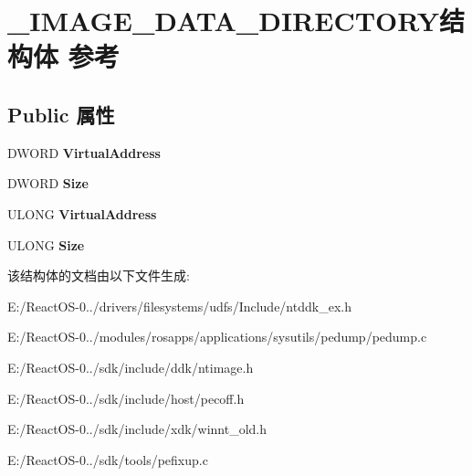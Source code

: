\hypertarget{struct___i_m_a_g_e___d_a_t_a___d_i_r_e_c_t_o_r_y}{}\section{\+\_\+\+I\+M\+A\+G\+E\+\_\+\+D\+A\+T\+A\+\_\+\+D\+I\+R\+E\+C\+T\+O\+R\+Y结构体 参考}
\label{struct___i_m_a_g_e___d_a_t_a___d_i_r_e_c_t_o_r_y}
\subsection*{Public 属性}
\begin{DoxyCompactItemize}
\item 
\mbox{\label{struct___i_m_a_g_e___d_a_t_a___d_i_r_e_c_t_o_r_y_a4367862469fd1ea60088ae02b1b6df70}} 
D\+W\+O\+RD {\bfseries Virtual\+Address}
\item 
\mbox{\label{struct___i_m_a_g_e___d_a_t_a___d_i_r_e_c_t_o_r_y_ab5bfce429cb0243cdc216f514108aa85}} 
D\+W\+O\+RD {\bfseries Size}
\item 
\mbox{\label{struct___i_m_a_g_e___d_a_t_a___d_i_r_e_c_t_o_r_y_ac81ca917d6fc6cd6c7577ce20c5a32d7}} 
U\+L\+O\+NG {\bfseries Virtual\+Address}
\item 
\mbox{\label{struct___i_m_a_g_e___d_a_t_a___d_i_r_e_c_t_o_r_y_a78282434acf9968f5e72bdeeee501946}} 
U\+L\+O\+NG {\bfseries Size}
\end{DoxyCompactItemize}


该结构体的文档由以下文件生成\+:\begin{DoxyCompactItemize}
\item 
E\+:/\+React\+O\+S-\/0../drivers/filesystems/udfs/\+Include/ntddk\+\_\+ex.\+h\item 
E\+:/\+React\+O\+S-\/0../modules/rosapps/applications/sysutils/pedump/pedump.\+c\item 
E\+:/\+React\+O\+S-\/0../sdk/include/ddk/ntimage.\+h\item 
E\+:/\+React\+O\+S-\/0../sdk/include/host/pecoff.\+h\item 
E\+:/\+React\+O\+S-\/0../sdk/include/xdk/winnt\+\_\+old.\+h\item 
E\+:/\+React\+O\+S-\/0../sdk/tools/pefixup.\+c\end{DoxyCompactItemize}
